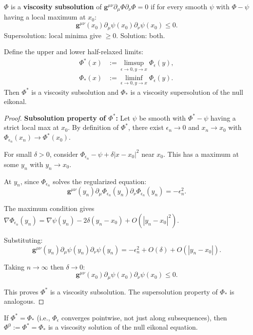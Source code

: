 \begin{definition}
$\Phi$ is a \textbf{viscosity subsolution} of $\mathbf{g}^{\mu\nu}\partial_\mu\Phi\partial_\nu\Phi = 0$ if for every smooth $\psi$ with $\Phi - \psi$ having a local maximum at $x_0$:
\[
\mathbf{g}^{\mu\nu}(x_0)\partial_\mu\psi(x_0)\partial_\nu\psi(x_0) \leq 0.
\]
Supersolution: local minima give $\geq 0$. Solution: both.
\end{definition}

\begin{lemma}\label{lem:halfrelax}
Define the upper and lower half-relaxed limits:
\begin{align}
    \Phi^*(x) &:= \limsup_{\epsilon \to 0, y \to x} \Phi_\epsilon(y), \\
    \Phi_*(x) &:= \liminf_{\epsilon \to 0, y \to x} \Phi_\epsilon(y).
\end{align}
Then $\Phi^*$ is a viscosity subsolution and $\Phi_*$ is a viscosity supersolution of the null eikonal.
\end{lemma}

\begin{proof}
\textbf{Subsolution property of $\Phi^*$:} Let $\psi$ be smooth with $\Phi^* - \psi$ having a strict local max at $x_0$. By definition of $\Phi^*$, there exist $\epsilon_n \to 0$ and $x_n \to x_0$ with $\Phi_{\epsilon_n}(x_n) \to \Phi^*(x_0)$.

For small $\delta > 0$, consider $\Phi_{\epsilon_n} - \psi + \delta|x - x_0|^2$ near $x_0$. This has a maximum at some $y_n$ with $y_n \to x_0$.

At $y_n$, since $\Phi_{\epsilon_n}$ solves the regularized equation:
\[
\mathbf{g}^{\mu\nu}(y_n)\partial_\mu\Phi_{\epsilon_n}(y_n)\partial_\nu\Phi_{\epsilon_n}(y_n) = -\epsilon_n^2.
\]

The maximum condition gives $\nabla\Phi_{\epsilon_n}(y_n) = \nabla\psi(y_n) - 2\delta(y_n - x_0) + O(|y_n - x_0|^2)$.

Substituting:
\[
\mathbf{g}^{\mu\nu}(y_n)\partial_\mu\psi(y_n)\partial_\nu\psi(y_n) = -\epsilon_n^2 + O(\delta) + O(|y_n - x_0|).
\]

Taking $n \to \infty$ then $\delta \to 0$:
\[
\mathbf{g}^{\mu\nu}(x_0)\partial_\mu\psi(x_0)\partial_\nu\psi(x_0) \leq 0.
\]

This proves $\Phi^*$ is a viscosity subsolution. The supersolution property of $\Phi_*$ is analogous.
\end{proof}

\begin{theorem}\label{thm:keyreg}
If $\Phi^* = \Phi_*$ (i.e., $\Phi_\epsilon$ converges pointwise, not just along subsequences), then $\Phi^0 := \Phi^* = \Phi_*$ is a viscosity solution of the null eikonal equation.
\end{theorem}

